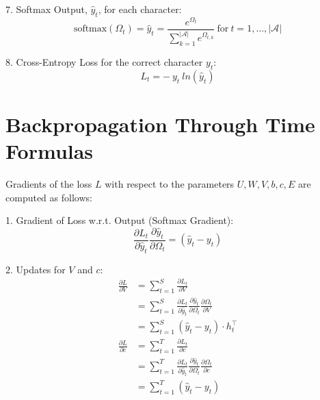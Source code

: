 \documentclass{article}
\begin{document}
7. Softmax Output, $\hat{y}_t$, for each character:
$$
\text{softmax} (\Omega_{t})=\hat{y}_{t}=\frac{e^{\Omega_t}}{\sum_{k=1}^{|\mathcal{A}|} e^{\Omega_{t,k}}} ~\text{for}~ t=1, \ldots, |\mathcal{A}|
$$

8. Cross-Entropy Loss for the correct character $y_{t}$:
$$
L_t = -~y_t~ln(\hat{y}_t)
$$
\section{Backpropagation Through Time Formulas}

Gradients of the loss $L$ with respect to the parameters $U, W, V, b, c, E$ are computed as follows:

1. Gradient of Loss w.r.t. Output (Softmax Gradient):
$$\label{eqn:partial_aV}
\frac{\partial L_t}{\partial \hat{y}_t}\frac{\partial \hat{y}_t}{\partial \Omega_t} = (\hat{y}_{t}-y_{t})
$$

2. Updates for $V$ and $c$:
\begin{align*} 
\frac{\partial L}{\partial V} &= \sum_{t=1}^{S} \frac{\partial L_{t}}{\partial V} \\
&= \sum_{t=1}^{S} \frac{\partial L_{t}}{\partial \hat{y}_{t}} \frac{\partial \hat{y}_{t}}{\partial \Omega_{t}} \frac{\partial \Omega_{t}}{\partial V}\\
&=\sum_{t=1}^{S} (\hat{y}_{t} - y_{t}) \cdot h_{t}^\top\\
\frac{\partial L}{\partial c} &= \sum_{t=1}^{T} \frac{\partial L_t}{\partial c} \\
&= \sum_{t=1}^{T} \frac{\partial L_{t}}{\partial \hat{y}_{t}} \frac{\partial \hat{y}_{t}}{\partial \Omega_{t}} \frac{\partial \Omega_{t}}{\partial c}\\
 &=\sum_{t=1}^{T} (\hat{y}_{t} - y_{t})
\end{align*}
\end{document}

